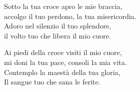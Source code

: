 
\strofa Sotto la tua croce apro le mie braccia,\\
accolgo il tuo perdono, la tua misericordia.\\
Adoro nel silenzio il tuo splendore,\\
il volto tuo che libera il mio cuore.

\spazio


\spazio

\strofa Ai piedi della croce visiti il mio cuore,\\
mi doni la tua pace, consoli la mia vita.\\
Contemplo la maestà della tua gloria,\\
Il sangue tuo che sana le ferite.

\spazio

 